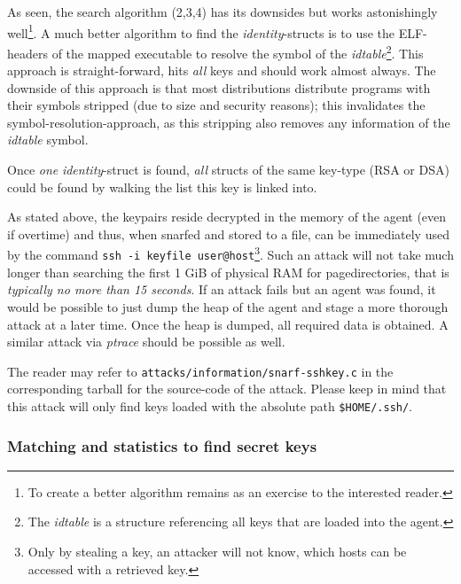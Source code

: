 As seen, the search algorithm (2,3,4) has its downsides but works astonishingly
well\footnote{To create a better algorithm remains as an exercise to the
interested reader.}. A much better algorithm to find the \emph{identity}-structs
is to use the ELF-headers of the mapped executable to resolve the symbol of the
\emph{idtable}\footnote{The \emph{idtable} is a structure referencing all keys
that are loaded into the agent.}. This approach is straight-forward, hits
\emph{all} keys and should work almost always. The downside of this approach is
that most distributions distribute programs with their symbols stripped (due to
size and security reasons); this invalidates the symbol-resolution-approach, as
this stripping also removes any information of the \emph{idtable} symbol.

Once \emph{one} \emph{identity}-struct is found, \emph{all} structs of the same
key-type (RSA or DSA) could be found by walking the list this key is linked
into.

As stated above, the keypairs reside decrypted in the memory of the agent (even
if overtime) and thus, when snarfed and stored to a file, can be immediately
used by the command \texttt{ssh~-i~keyfile~user@host}\footnote{Only by stealing
a key, an attacker will not know, which hosts can be accessed with a retrieved
key.}. Such an attack will not take much longer than searching the first 1 GiB
of physical RAM for pagedirectories, that is \emph{typically no more than 15
seconds}. If an attack fails but an agent was found, it would be possible to
just dump the heap of the agent and stage a more thorough attack at a later
time. Once the heap is dumped, all required data is obtained. A similar attack
via \emph{ptrace} should be possible as well.

The reader may refer to \texttt{attacks/information/snarf-sshkey.c} in the
corresponding tarball for the source-code of the attack. Please keep in mind
that this attack will only find keys loaded with the absolute path
\texttt{\$HOME/.ssh/}.


\subsubsection{Matching and statistics to find secret keys}

